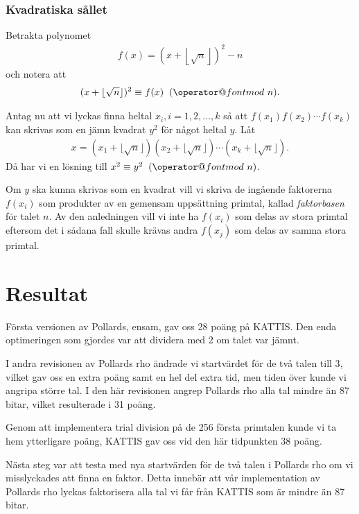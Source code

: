 \documentclass[a4paper,12pt]{article}
\makeatletter
\def\imod#1{\allowbreak\mkern10mu({\operator@font mod}\,\,#1)}
\renewcommand{\*}{\ensuremath{\cdot}}
\makeatother
\begin{document}
\subsubsection{Kvadratiska sållet}

Betrakta polynomet 
\begin{align*}
    f(x) = (x + \left\lfloor \sqrt{n} \right\rfloor)^2 - n
\end{align*}
och notera att
\begin{align*}
    (x + \lfloor \sqrt{n} \rfloor)^2 \equiv f(x) \imod{n}.
\end{align*}

Antag nu att vi lyckas finna heltal $x_i, i = 1, 2, \dots, k$ så att
$f(x_1)f(x_2)\cdots f(x_k)$ kan skrivas som en jämn kvadrat $y^2$ för något
heltal $y$. Låt 
\begin{align*}
    x = (x_1 + \lfloor \sqrt{n} \rfloor) (x_2 + \lfloor \sqrt{n} \rfloor)\cdots
    (x_k + \lfloor \sqrt{n} \rfloor).
\end{align*}
Då har vi en lösning till $x^2 \equiv y^2 \imod{n}$.

Om $y$ ska kunna skrivas som en kvadrat vill vi skriva de ingående faktorerna
$f(x_i)$ som produkter av en gemensam uppsättning primtal, kallad 
\emph{faktorbasen} för talet $n$. Av den anledningen vill vi inte ha $f(x_i)$
som delas av stora primtal eftersom det i sådana fall skulle krävas andra
$f(x_j)$ som delas av samma stora primtal. 






\section{Resultat}

Första versionen av Pollards, ensam, gav oss 28 poäng på KATTIS. Den enda optimeringen som gjordes var att dividera med 2 om talet var jämnt.

I andra revisionen av Pollards rho ändrade vi startvärdet för de två talen till 3, vilket gav oss en extra poäng samt en hel del extra tid, men tiden över kunde vi angripa större tal. I den här revisionen angrep Pollards rho alla tal mindre än 87 bitar, vilket resulterade i 31 poäng.

Genom att implementera trial division på de 256 första primtalen kunde vi ta hem ytterligare poäng, KATTIS gav oss vid den här tidpunkten 38 poäng.

Nästa steg var att testa med nya startvärden för de två talen i Pollards rho om vi misslyckades att finna en faktor. Detta innebär att vår implementation av Pollards rho lyckas faktorisera alla tal vi får från KATTIS som är mindre än 87 bitar.
\end{document}
